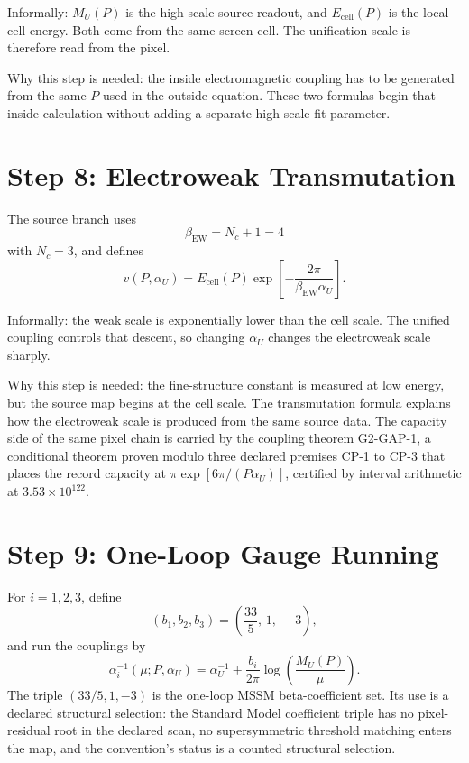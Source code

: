 \documentclass[11pt]{article}
\theoremstyle{remark}
\newcommand{\Nc}{N_c}
\begin{document}
Informally: \(M_U(P)\) is the high-scale source readout, and \(E_{\mathrm{cell}}(P)\) is the local cell energy. Both come from the same screen cell. The unification scale is therefore read from the pixel.

Why this step is needed: the inside electromagnetic coupling has to be generated from the same \(P\) used in the outside equation. These two formulas begin that inside calculation without adding a separate high-scale fit parameter.

\section{Step 8: Electroweak Transmutation}

The source branch uses
\begin{equation}
\beta_{\mathrm{EW}}=\Nc+1=4
\end{equation}
with \(\Nc=3\), and defines
\begin{equation}
v(P,\alpha_U)
=
E_{\mathrm{cell}}(P)
\exp\!\left[-\frac{2\pi}{\beta_{\mathrm{EW}}\alpha_U}\right].
\label{eq:v}
\end{equation}

Informally: the weak scale is exponentially lower than the cell scale. The unified coupling controls that descent, so changing \(\alpha_U\) changes the electroweak scale sharply.

Why this step is needed: the fine-structure constant is measured at low energy, but the source map begins at the cell scale. The transmutation formula explains how the electroweak scale is produced from the same source data. The capacity side of the same pixel chain is carried by the coupling theorem G2-GAP-1, a conditional theorem proven modulo three declared premises CP-1 to CP-3 that places the record capacity at \(\pi\exp[6\pi/(P\alpha_U)]\), certified by interval arithmetic at \(3.53\times10^{122}\).

\section{Step 9: One-Loop Gauge Running}

For \(i=1,2,3\), define
\begin{equation}
(b_1,b_2,b_3)=\left(\frac{33}{5},\,1,\,-3\right),
\label{eq:b}
\end{equation}
and run the couplings by
\begin{equation}
\alpha_i^{-1}(\mu;P,\alpha_U)
=
\alpha_U^{-1}
+ 
\frac{b_i}{2\pi}\log\!\left(\frac{M_U(P)}{\mu}\right).
\label{eq:running}
\end{equation}
The triple \((33/5,1,-3)\) is the one-loop MSSM beta-coefficient set. Its use
is a declared structural selection: the Standard Model coefficient triple has
no pixel-residual root in the declared scan, no supersymmetric threshold
matching enters the map, and the convention's status is a counted structural
selection.
\end{document}
